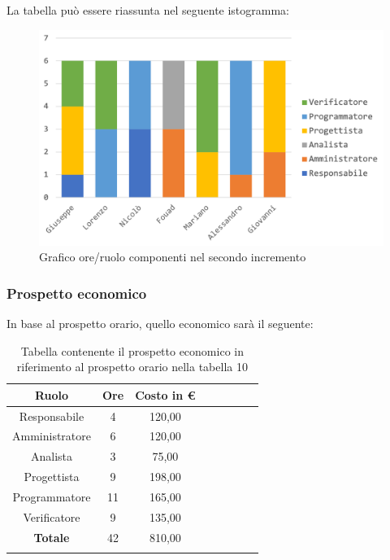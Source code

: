 		La tabella può essere riassunta nel seguente istogramma:
		\begin{figure}[H]
			\centering
			\includegraphics[width=0.8\linewidth]{./images/preventivo/incremento2-1.png}
			\caption{Grafico ore/ruolo componenti nel secondo incremento}
			\label{fig:grafico suddivione ruoli incremento II}
		\end{figure}
		
		\subsubsection{Prospetto economico}
		In base al prospetto orario, quello economico sarà il seguente: 
		
		\begin{longtable}{|c|c|c|c|c|c|c|c|}
			\hline
			\rowcolor{lighter-grayer}
			\textbf{Ruolo} & \textbf{Ore} & \textbf{Costo in € } \\
			\hline
			\endfirsthead
			
			\hline
			Responsabile 	    & 4 & 120,00\\
			\hline 
			\hline
			Amministratore	   & 6 & 120,00\\
			\hline
			\hline
			Analista 				& 3 & 75,00\\
			\hline
			\hline
			Progettista 		   & 9 & 198,00\\
			\hline
			\hline
			Programmatore 	  & 11 & 165,00\\
			\hline
			\hline
			Verificatore 		   & 9 & 135,00\\
			\hline
			\textbf{Totale} 	 & 42 & 810,00\\
			\hline
			\caption{Tabella contenente il prospetto economico in riferimento al prospetto orario nella tabella 10}
		\end{longtable}
		\pagebreak
		
